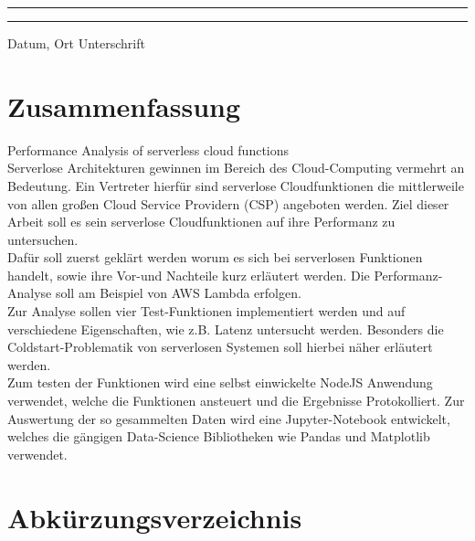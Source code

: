 \documentclass[12pt,a4paper,parskip=half]{scrreprt}
\begin{document}
\vfill
\noindent\rule{5cm}{.4pt}\hfill\rule{5cm}{.4pt}\par
\noindent Datum, Ort \hfill Unterschrift 

\newpage
\thispagestyle{empty}
\chapter*{Zusammenfassung}

 Performance Analysis of serverless cloud functions
\\
Serverlose Architekturen gewinnen im Bereich des Cloud-Computing vermehrt an Bedeutung. Ein Vertreter hierfür sind serverlose Cloudfunktionen die mittlerweile von allen großen Cloud Service Providern (CSP) angeboten werden. Ziel dieser Arbeit soll es sein serverlose Cloudfunktionen auf ihre Performanz zu untersuchen.
\\
Dafür soll zuerst geklärt werden worum es sich bei serverlosen Funktionen handelt, sowie ihre Vor-und Nachteile kurz erläutert werden. Die Performanz-Analyse soll am Beispiel von AWS Lambda erfolgen.
\\
Zur Analyse sollen vier Test-Funktionen implementiert werden und auf verschiedene Eigenschaften, wie z.B. Latenz untersucht werden. Besonders die Coldstart-Problematik von serverlosen Systemen soll hierbei näher erläutert werden.
\\
Zum testen der Funktionen wird eine selbst einwickelte NodeJS Anwendung verwendet, welche die Funktionen ansteuert und die Ergebnisse Protokolliert. Zur Auswertung der so gesammelten Daten wird eine Jupyter-Notebook entwickelt, welches die gängigen Data-Science Bibliotheken wie Pandas und Matplotlib verwendet.


\bigskip


\tableofcontents
{}

\listoffigures
{} 

\newpage
\chapter*{Abkürzungsverzeichnis}
\begin{acronym}[HTTP]
\end{acronym}
\end{document}
